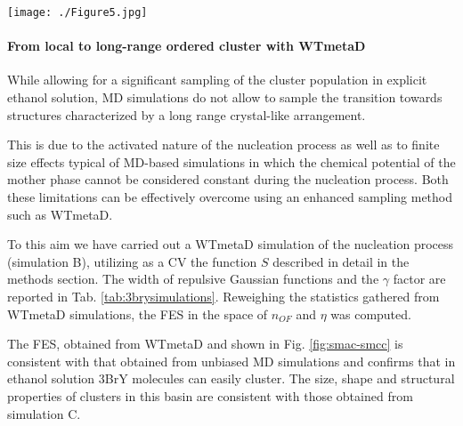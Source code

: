\documentclass[journal=cgdefu,manuscript=article,layout=twocolumn]{achemso}
\begin{document}
\begin{figure*}[ht!]
\centering
\texttt{[image: ./Figure5.jpg]}
\caption{Simulation C. A) FES reweighed from the WTmetaD simulation reported as a function of $\eta$ and $n_{OF}$. The red contour is reported to illustrate the limit of the unbiased MD simulation. While the global minimum is still at $\eta$ about 0.35, clusters with an ordered fraction greater than 0.6 can now be obtained. B) Examples of clusters obtained from the WTmetaD simulation were molecules with $\Gamma_i>$ 0.3 were colored according to their $\Gamma_i$  
(a red-white-blue scale was used where $\Gamma_i$=0.3 corresponds to red and $\Gamma_i$=1 corresponds to blue). Molecules with a $\Gamma_i<$0.3 were reported in transparent gray.}
\label{fig:smac-smcc}
\end{figure*} 

\paragraph{From local to long-range ordered cluster with WTmetaD}

While allowing for a significant sampling of the cluster population in explicit ethanol solution, MD simulations do not allow to sample the transition towards structures characterized by a long range crystal-like arrangement. 

This is due to the activated nature of the nucleation process as well as to finite size effects typical of MD-based simulations in which the chemical potential of the mother phase cannot be considered constant during the nucleation process\cite{salvalaglio2015molecular}. Both these limitations can be effectively overcome using an enhanced sampling method such as WTmetaD\cite{salvalaglio2015molecular,salvalaglio2015urea,salvalaglio2016overcoming}. 

To this aim we have carried out a WTmetaD simulation of the nucleation process (simulation B), utilizing as a CV the function $S$ described in detail in the methods section.  The width of repulsive Gaussian functions and the $\gamma$ factor are reported in Tab. \ref{tab:3brysimulations}.
Reweighing \cite{bonomi2009reconstructing} the statistics gathered from WTmetaD simulations, the FES in the space of $n_{OF}$ and $\eta$ was computed. 

The FES, obtained from WTmetaD and shown in Fig. \ref{fig:smac-smcc} is consistent with that obtained from unbiased MD simulations and confirms that in ethanol solution 3BrY molecules can easily cluster. The size, shape and structural properties of clusters in this basin are consistent with those obtained from simulation C. 
\end{document}
